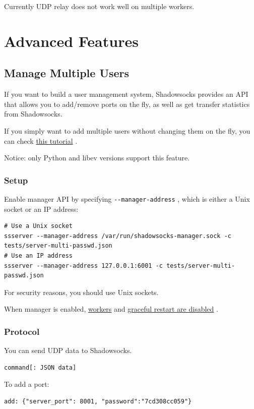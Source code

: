 \documentclass[11pt,a4paper]{sphinxmanual}
\begin{document}
Currently UDP relay does not work well on multiple workers.




\chapter{Advanced Features}
\label{sec-6}
\label{sec:manage_multiple_users}
\section{Manage Multiple Users}
\label{sec-6-1}
If you want to build a user management system, Shadowsocks provides an API that allows you to add/remove ports on the fly, as well as get transfer statistics from Shadowsocks.

If you simply want to add multiple users without changing them on the fly, you can check \hyperref[sec:cmu]{this tutorial} . 

Notice: only Python and libev versions support this feature.

\subsection{Setup}
\label{sec-6-1-1}
Enable manager API by specifying \verb~--manager-address~ , which is either a Unix socket or an IP address:

\begin{Verbatim}
# Use a Unix socket
ssserver --manager-address /var/run/shadowsocks-manager.sock -c tests/server-multi-passwd.json
# Use an IP address
ssserver --manager-address 127.0.0.1:6001 -c tests/server-multi-passwd.json
\end{Verbatim}

For security reasons, you should use Unix sockets.

When manager is enabled, \hyperref[sec:workers]{workers} and \hyperref[sec:graceful_shutdown_and_restart]{graceful restart are disabled} .

\subsection{Protocol}
\label{sec-6-1-2}
You can send UDP data to Shadowsocks.
\begin{Verbatim}
command[: JSON data]
\end{Verbatim}

To add a port:
\begin{Verbatim}
add: {"server_port": 8001, "password":"7cd308cc059"}
\end{Verbatim}
\end{document}

